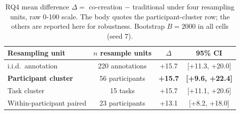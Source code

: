 \begin{table}[t]
\centering\footnotesize
\caption{RQ4 mean difference $\Delta = $ co-creation $-$ traditional under four resampling units, raw 0-100 scale. The body quotes the participant-cluster row; the others are reported here for robustness. Bootstrap $B=2000$ in all cells (seed $7$).}
\label{tbl-rq4-bootstraps}
\setlength{\tabcolsep}{4pt}
\begin{tabular*}{\textwidth}{@{\extracolsep{\fill}}lccc@{}}
\toprule
Resampling unit & $n$ resample units & $\Delta$ & 95\% CI \\
\midrule
i.i.d.\ annotation & 220 annotations & +15.7 & [+11.3, +20.0] \\
\textbf{Participant cluster} & 56 participants & \textbf{+15.7} & \textbf{[+9.6, +22.4]} \\
Task cluster & 15 tasks & +15.7 & [+11.1, +20.6] \\
Within-participant paired & 23 participants & +13.1 & [+8.2, +18.0] \\
\bottomrule
\end{tabular*}
\end{table}
